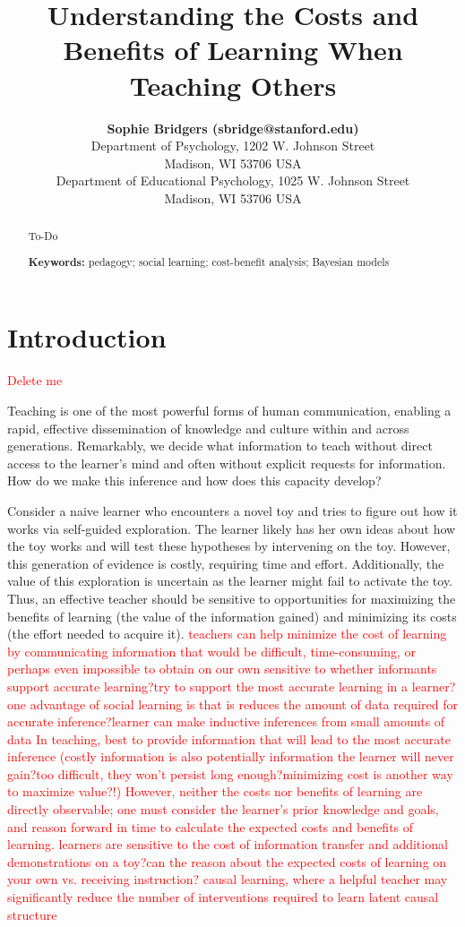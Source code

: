 \documentclass[10pt,letterpaper]{article}
\title{Understanding the Costs and Benefits of Learning When Teaching Others}
\author{{\large \bf Sophie Bridgers (sbridge@stanford.edu)} \\
  Department of Psychology, 1202 W. Johnson Street \\
  Madison, WI 53706 USA
  \AND {\large \bf Emily Tang (emjtang@stanford.edu)} \\
  Department of Educational Psychology, 1025 W. Johnson Street \\
  Madison, WI 53706 USA}
\newcommand{\red}[1]{\textcolor{Red}{#1}}
\begin{document}
\maketitle


\begin{abstract}
To-Do

\textbf{Keywords:} 
pedagogy; social learning; cost-benefit analysis; Bayesian models
\end{abstract}


\section{Introduction}

\red{Delete me}

Teaching is one of the most powerful forms of human communication, enabling a rapid, effective dissemination of knowledge and culture within and across generations. Remarkably, we decide what information to teach without direct access to the learner's mind and often without explicit requests for information. How do we make this inference and how does this capacity develop? 

Consider a naive learner who encounters a novel toy and tries to figure out how it works via self-guided exploration. The learner likely has her own ideas about how the toy works and will test these hypotheses by intervening on the toy. However, this generation of evidence is costly, requiring time and effort. Additionally, the value of this exploration is uncertain as the learner might fail to activate the toy. Thus, an effective teacher should be sensitive to opportunities for maximizing the benefits of learning (the value of the information gained) and minimizing its costs (the effort needed to acquire it). 
\red{teachers can help minimize the cost of learning by communicating information that would be difficult, time-consuming, or perhaps even impossible to obtain on our own
sensitive to whether informants support accurate learning?try to support the most accurate learning in a learner?
one advantage of social learning is that is reduces the amount of data required for accurate inference?learner can make inductive inferences from small amounts of data
In teaching, best to provide information that will lead to the most accurate inference (costly information is also potentially information the learner will never gain?too difficult, they won't persist long enough?minimizing cost is another way to maximize value?!)
However, neither the costs nor benefits of learning are directly observable; one must consider the learner's prior knowledge and goals, and reason forward in time to calculate the expected costs and benefits of learning.
learners are sensitive to the cost of information transfer and additional demonstrations on a toy?can the reason about the expected costs of learning on your own vs. receiving instruction?
causal learning, where a helpful teacher may significantly reduce the number of interventions required to learn latent causal structure}
\end{document}
